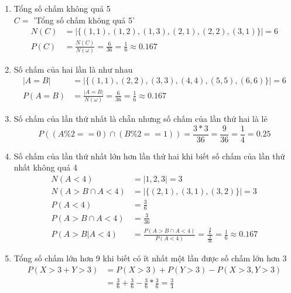 \documentclass[a4paper,12pt]{article}
\begin{document}
\begin{enumerate}[label=\alph*)]
	\item Tổng số chấm không quá 5 \\
	
	$C =$ 'Tổng số chấm không quá 5' \\
	\begin{align*}
		N(C) &= |\{(1, 1), (1, 2), (1, 3), (2, 1), (2, 2), (3, 1)\}| = 6 \\
		P(C) &= \frac{N(C)}{N(\omega)} = \frac{6}{36} = \frac{1}{6} \approx 0.167
	\end{align*}
	
	\item Số chấm của hai lần là như nhau \\
	\begin{align*}
		|A = B| &= |\{(1, 1), (2, 2), (3, 3), (4, 4), (5, 5), (6, 6)\}| = 6 \\
		P(A = B) &= \frac{|A = B|}{N(\omega)} = \frac{6}{36} = \frac{1}{6} \approx 0.167
	\end{align*}
	
	\item Số chấm của lần thứ nhất là chẵn nhưng số chấm của lần thứ hai là lẻ \\
	\begin{equation*}
		P((A \% 2 == 0) \cap (B \% 2 == 1)) = \frac{3*3}{36} = \frac{9}{36} = \frac{1}{4} = 0.25
	\end{equation*}
	
	\item Số chấm của lần thứ nhất lớn hơn lần thứ hai khi biết số chấm của lần thứ nhất không quá 4\\
	\begin{align*}
		N(A < 4) &= |{1, 2, 3}| = 3 \\
		N(A > B \cap A < 4) &= |\{(2, 1), (3, 1), (3, 2)\}| = 3 \\
		P(A<4) &= \frac{3}{6} \\
		P(A > B \cap A < 4) &= \frac{3}{36} \\
		P(A > B | A < 4) &= \frac{P(A > B \cap A < 4)}{P(A<4)} = \displaystyle{\frac{\frac{3}{6}}{\frac{3}{36}}} = \frac{1}{6} \approx 0.167
	\end{align*}
	
	\item Tổng số chấm lớn hơn 9 khi biết có ít nhất một lần được số chấm lớn hơn 3 \\
	\begin{align*}
		P(X > 3 + Y > 3) &= P(X > 3) + P(Y > 3) - P(X > 3, Y > 3) \\
		&= \frac{3}{6} + \frac{3}{6} - \frac{3}{6}*\frac{3}{6} = \frac{3}{4}
	\end{align*}
	

\end{enumerate}
\end{document}
